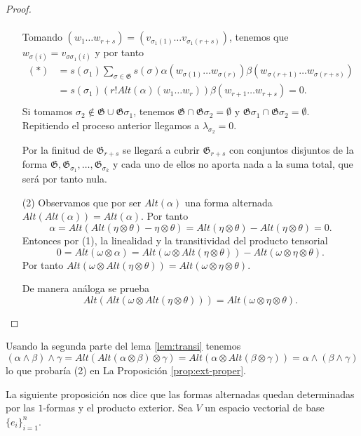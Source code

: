 \documentclass[\main/VD_completo.tex]{subfiles}
\begin{document}
\begin{proof}
\begin{enumerate}
\begin{align*}
\end{align*}
Tomando \( (w_1\ldots w_{r+s})=(v_{\sigma_1(1)}\ldots v_{\sigma_1(r+s)}) \), tenemos que \( w_{\sigma(i)}=v_{\sigma\sigma_1(i)} \) y por tanto
\begin{align*}
(*)&= s(\sigma_1)\sum_{\sigma\in \mathfrak{G}}s(\sigma)\alpha(w_{\sigma(1)}\ldots w_{\sigma(r)})\beta(w_{\sigma(r+1)}\ldots w_{\sigma(r+s)})\\
&= s(\sigma_1)(r!Alt(\alpha)(w_1\ldots w_r))\beta(w_{r+1}\ldots w_{r+s}) = 0.\\
\end{align*}
Si tomamos \( \sigma_2\notin \mathfrak{G}\cup \mathfrak{G}\sigma_1 \), tenemos \( \mathfrak{G}\cap \mathfrak{G}\sigma_2=\emptyset \) y \( \mathfrak{G}\sigma_1\cap \mathfrak{G}\sigma_2=\emptyset \).\\
Repitiendo el proceso anterior llegamos a \( \lambda_{\sigma_2}=0 \).

Por la finitud de \( \mathfrak{G}_{r+s} \) se llegará a cubrir \( \mathfrak{G}_{r+s} \) con conjuntos disjuntos de la forma \( \mathfrak{G}, \mathfrak{G}_{\sigma_1},\ldots,\mathfrak{G}_{\sigma_k} \) y cada uno de ellos no aporta nada a la suma total, que será por tanto nula.
\item [(2)] Observamos que por ser \( Alt(\alpha) \) una forma alternada \( Alt(Alt(\alpha))=Alt(\alpha) \). Por tanto
\[
\alpha = Alt(Alt(\eta\otimes\theta)-\eta\otimes\theta) = Alt(\eta\otimes\theta)-Alt(\eta\otimes\theta) =0.
\]
Entonces por (1), la linealidad y la transitividad del producto tensorial
\[
0=Alt(\omega\otimes\alpha)=Alt(\omega\otimes Alt(\eta\otimes\theta))-Alt(\omega\otimes\eta\otimes\theta).
\]
Por tanto \( Alt(\omega\otimes Alt(\eta\otimes\theta))=Alt(\omega\otimes\eta\otimes\theta) \).

De manera análoga se prueba 
\[
Alt(Alt(\omega\otimes Alt(\eta\otimes\theta)))=Alt(\omega\otimes\eta\otimes\theta).
 \]
\end{enumerate}
\end{proof}

\begin{note}
Usando la segunda parte del lema \ref{lem:transi} tenemos
\[
(\alpha\wedge\beta)\wedge\gamma=Alt(Alt(\alpha\otimes\beta)\otimes\gamma)=
Alt(\alpha\otimes Alt(\beta\otimes\gamma))=\alpha\wedge(\beta\wedge\gamma)
\]
lo que probaría (2) en La Proposición \ref{prop:ext-proper}.
\end{note}

La siguiente proposición nos dice que las formas alternadas quedan determinadas por las \(1\)-formas y el producto exterior. Sea $V$ un espacio vectorial de base \( \{e_i\}_{i=1}^n \).
\end{document}
